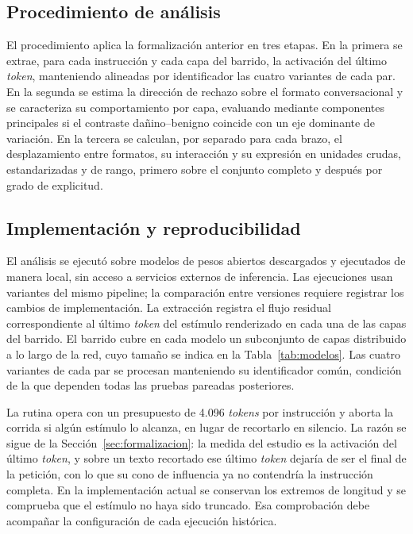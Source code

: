 \subsection{Procedimiento de análisis}

El procedimiento aplica la formalización anterior en tres etapas. En la primera se extrae, para cada instrucción y cada capa del barrido, la activación del último \textit{token}, manteniendo alineadas por identificador las cuatro variantes de cada par. En la segunda se estima la dirección de rechazo sobre el formato conversacional y se caracteriza su comportamiento por capa, evaluando mediante componentes principales si el contraste dañino--benigno coincide con un eje dominante de variación. En la tercera se calculan, por separado para cada brazo, el desplazamiento entre formatos, su interacción y su expresión en unidades crudas, estandarizadas y de rango, primero sobre el conjunto completo y después por grado de explicitud.

\subsection{Implementación y reproducibilidad}

El análisis se ejecutó sobre modelos de pesos abiertos descargados y
ejecutados de manera local, sin acceso a servicios externos de inferencia.
Las ejecuciones usan variantes del mismo pipeline; la comparación entre versiones requiere registrar los cambios de implementación. La extracción
registra el flujo residual correspondiente al último \textit{token} del
estímulo renderizado en cada una de las capas del barrido. El barrido cubre en cada
modelo un subconjunto de capas distribuido a lo largo de la red, cuyo tamaño
se indica en la Tabla~\ref{tab:modelos}. Las cuatro variantes de cada par se
procesan manteniendo su identificador común, condición de la que dependen
todas las pruebas pareadas posteriores.

La rutina opera con un presupuesto de 4.096 \textit{tokens} por instrucción y
aborta la corrida si algún estímulo lo alcanza, en lugar de recortarlo en
silencio. La razón se sigue de la Sección~\ref{sec:formalizacion}: la medida
del estudio es la activación del último \textit{token}, y sobre un texto
recortado ese último \textit{token} dejaría de ser el final de la petición,
con lo que su cono de influencia ya no contendría la instrucción completa.
En la implementación actual se conservan los extremos de longitud y se comprueba que el estímulo no haya sido truncado. Esa comprobación debe acompañar la configuración de cada ejecución histórica.

